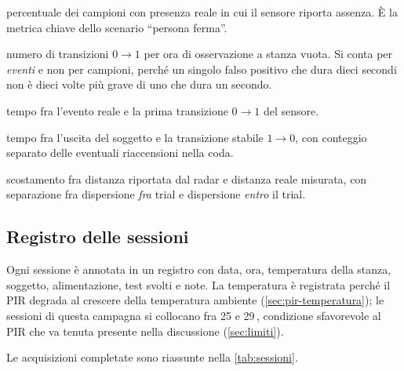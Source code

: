 \begin{description}[leftmargin=1.4em,style=nextline,itemsep=3pt]
  \item[Falsi negativi (\%)] percentuale dei campioni con presenza reale in cui il
    sensore riporta assenza. È la metrica chiave dello scenario ``persona ferma''.
  \item[Falsi positivi (eventi/h)] numero di transizioni $0 \to 1$ per ora di
    osservazione a stanza vuota. Si conta per \emph{eventi} e non per campioni,
    perché un singolo falso positivo che dura dieci secondi non è dieci volte più
    grave di uno che dura un secondo.
  \item[Latenza di rilevamento] tempo fra l'evento reale e la prima transizione
    $0 \to 1$ del sensore.
  \item[Latenza di rilascio] tempo fra l'uscita del soggetto e la transizione
    stabile $1 \to 0$, con conteggio separato delle eventuali riaccensioni nella
    coda.
  \item[Accuratezza della distanza] scostamento fra distanza riportata dal radar e
    distanza reale misurata, con separazione fra dispersione \emph{fra} trial e
    dispersione \emph{entro} il trial.
\end{description}

\subsection{Registro delle sessioni}
\label{sec:registro}

Ogni sessione è annotata in un registro con data, ora, temperatura della stanza,
soggetto, alimentazione, test svolti e note. La temperatura è registrata perché il
PIR degrada al crescere della temperatura ambiente (\cref{sec:pir-temperatura}); le
sessioni di questa campagna si collocano fra 25 e 29\,\celsius, condizione
sfavorevole al PIR che va tenuta presente nella discussione (\cref{sec:limiti}).

Le acquisizioni completate sono riassunte nella \cref{tab:sessioni}.


